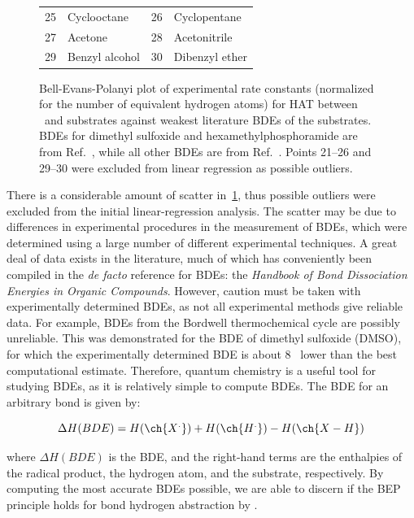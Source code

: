 \begin{doublespace}
\begin{figure}[!htbp]
\begin{tabularx}{\textwidth}{| l X l X |}
  25 & Cyclooctane & 26 & Cyclopentane  \\
  27 & Acetone & 28 & Acetonitrile \\
  29 & Benzyl alcohol & 30 & Dibenzyl ether \\
  \hline
\end{tabularx}
  \caption[Bell-Evans-Polanyi plot of experimental rate constants against
  literature BDEs.]{Bell-Evans-Polanyi plot of experimental rate constants
  (normalized for the number of equivalent hydrogen atoms) for HAT between
  \cumo\ and substrates against weakest literature  BDEs of the
  substrates. BDEs for dimethyl sulfoxide and hexamethylphosphoramide are from
  Ref.~\protect{}, while all other BDEs are from
  Ref.~\protect{}. Points 21--26 and 29--30 were excluded from
  linear regression as possible outliers.}
  \label{fig:bep-expt}
\end{figure}

There is a considerable amount of scatter in~\ref{fig:bep-expt}, thus possible
outliers were excluded from the initial linear-regression analysis. The scatter
may be due to differences in experimental procedures in the measurement of BDEs,
which were determined using a large number of different experimental techniques.
A great deal of data exists in the literature, much of which has conveniently
been compiled in the \emph{de facto} reference for BDEs: the \emph{Handbook
of Bond Dissociation Energies in Organic Compounds}.\cite{Luo2002} However,
caution must be taken with experimentally determined BDEs, as not all
experimental methods give reliable data. For example, BDEs from the
Bordwell\cite{Bordwell1988} thermochemical cycle are possibly
unreliable.\cite{Salamone2012, Miller2016} This was demonstrated for the BDE of
dimethyl sulfoxide (DMSO), for which the experimentally determined BDE is about
8 \kcalmol\ lower than the best computational estimate.\cite{Salamone2012}
Therefore, quantum chemistry is a useful tool for studying BDEs, as it is
relatively simple to compute BDEs. The BDE for an arbitrary  bond is
given by:

\begin{equation}
  \Delta H(BDE) =  H(\ch{X^.}) + H(\ch{H^.}) - H(\ch{X-H})
\end{equation}

\noindent where $\Delta H(BDE)$ is the BDE, and the right-hand terms are the
enthalpies of the radical product, the hydrogen atom, and the substrate,
respectively. By computing the most accurate BDEs possible, we are able to
discern if the BEP principle holds for  bond hydrogen abstraction by
\cumo.


\end{doublespace}
